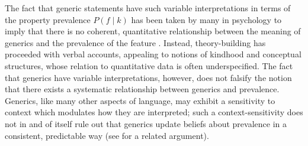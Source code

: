 \documentclass[floatsintext,doc]{apa6}
\begin{document}
The fact that generic statements have such variable interpretations in terms of the property prevalence $P(f \mid k)$ has been taken by many in psychology to imply that there is no coherent, quantitative relationship between the meaning of generics and the prevalence of the feature \cite{Leslie2008, Cimpian2010, Khemlani2012, Prasada2013}. 
Instead, theory-building has proceeded with verbal accounts, appealing to notions of kindhood and conceptual structures, whose relation to quantitative data is often underspecified.
The fact that generics have variable interpretations, however, does not falsify the notion that there exists a systematic relationship between generics and prevalence.
Generics, like many other aspects of language, may exhibit a sensitivity to context  which  modulates how they are interpreted; such a context-sensitivity does not in and of itself rule out that generics update beliefs about prevalence in a consistent, predictable way (see  for a related argument). 

\end{document}
